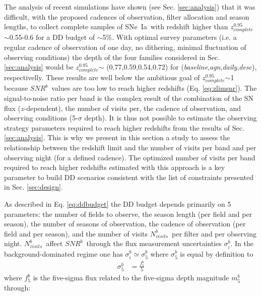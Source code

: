 \documentclass[skiphelvet,twocolumn]{aastex63}
\newcommand{\snrb}{\mbox{$SNR^b$}}
\newcommand{\sne}{{SNe~Ia}}
\newcommand{\zcompb}{\mbox{$z_{complete}^{0.95}$}}
\newcommand{\per}{$\%$}
\newcommand{\seq}{$\sim$}
\newcommand{\nvisitsb}{\mbox{$N_{visits}^b$}}
\newcommand{\sumnvisitsb}{\mbox{$\sum\limits_{b}N_{visits}^b$}}
\newcommand{\osfamily}[1]{{\it #1}}
\begin{document}
The analysis of recent simulations have shown (see Sec. \ref{sec:analysis}) that it was difficult, with the proposed cadences of observation, filter allocation and season lengths, to collect complete samples of \sne~with redshift higher than \zcompb\seq 0.55-0.6 for a DD budget of \seq 5\per.  %
With optimal survey parameters (i.e. a regular cadence of observation of one day, no dithering, minimal fluctuation of observing conditions) the depth of the four families considered in Sec. \ref{sec:analysis} would be \zcompb $\sim$ (0.77,0.59,0.54,0.72) for (\osfamily{baseline},\osfamily{agn},\osfamily{daily},\osfamily{desc}), respectivelly. These results are well below the ambitious goal of \zcompb\seq1 because \snrb~values are too low to reach higher redshifts (Eq. \ref{eq:zlimsnr}). The signal-to-noise ratio per band is the complex result of the combination of the SN flux ($z$-dependent), the number of visits per, the cadence of observation, and observing conditions (5-$\sigma$ depth). It is thus not possible to estimate the 
observing strategy parameters required to reach higher redshifts from the results of Sec. \ref{sec:analysis}. This is why we present in this section a study to assess the relationship between the redshift limit and the number of visits per band and per observing night (for a defined cadence). The optimized number of visits per band required to reach higher redshifts estimated with this approach is a key parameter to build DD scenarios consistent with the list of constraints presented in Sec. \ref{sec:design}.
\par
As described in Eq. \ref{eq:ddbudget} the DD budget depends primarily on 5 parameters: the number of fields to observe, the season length (per field and per season), the number of seasons of observation, the cadence of observation (per field and per season), and the number of visits \nvisitsb~per filter and per observing night. \nvisitsb~affect \snrb~through the flux measurement uncertainties  $\sigma_i^b$. In the background-dominated regime one has $\sigma_i^b \simeq \sigma_5^b$ where $\sigma_5^b$ is equal by definition to
\begin{equation}\label{eq:opt2}
  \begin{aligned}
    \sigma_5^b &=  \frac{f_5^b}{5}
    \end{aligned}
\end{equation}
where $f_ 5^b$ is the five-sigma flux related to the five-sigma depth magnitude $m_5^b$ through:
\end{document}
